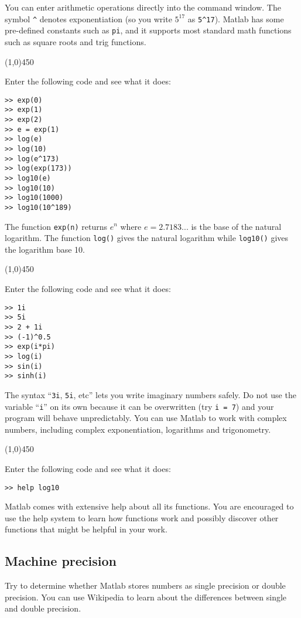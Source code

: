 \documentclass[12pt,a4paper]{article}   %
\newcommand{\code}[1]{\texttt{#1}}
\newcommand{\ruler}{
  \begin{center}
    \line(1,0){450}
  \end{center}
}
\begin{document}
You can enter arithmetic operations directly into the command window. The symbol \code{\^}
denotes exponentiation (so you write $5^{17}$ as \code{5\^}\code{17}). Matlab has some pre-defined
constants such as \code{pi}, and it supports most standard math functions such as square
roots and trig functions.

\ruler

Enter the following code and see what it does:

\begin{verbatim}
>> exp(0)
>> exp(1)
>> exp(2)
>> e = exp(1)
>> log(e)
>> log(10)
>> log(e^173)
>> log(exp(173))
>> log10(e)
>> log10(10)
>> log10(1000)
>> log10(10^189)
\end{verbatim}

The function \code{exp(n)} returns $e^n$ where $e = 2.7183...$ is the base of the
natural logarithm. The function \texttt{log()} gives the natural logarithm
while \code{log10()} gives the logarithm base 10.

\ruler

Enter the following code and see what it does:

\begin{verbatim}
>> 1i
>> 5i
>> 2 + 1i
>> (-1)^0.5
>> exp(i*pi)
>> log(i)
>> sin(i)
>> sinh(i)
\end{verbatim}

The syntax ``\code{3i}, \code{5i}, etc'' lets you write imaginary numbers safely. Do not use
the variable ``\code{i}'' on its own because it can be overwritten (try \code{i = 7}) and
your program will behave unpredictably. You can use Matlab to work with complex numbers,
including complex exponentiation, logarithms and trigonometry.

\ruler

Enter the following code and see what it does:

\begin{verbatim}
>> help log10
\end{verbatim}

Matlab comes with extensive help about all its functions. You are encouraged to use the
help system to learn how functions work and possibly discover other functions that might
be helpful in your work.

\subsection{Machine precision}

Try to determine whether Matlab stores numbers as single precision or double precision.
You can use Wikipedia to learn about the differences between single and double precision.
\end{document}
